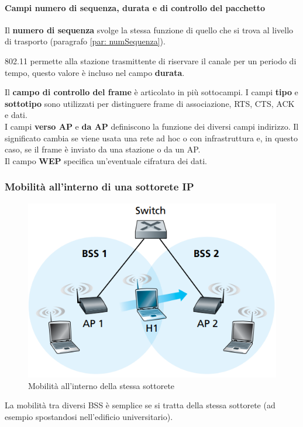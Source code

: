 \documentclass[11pt,a4paper]{article}
\begin{document}
{\paragraph{Campi numero di sequenza, durata e di controllo del pacchetto}
Il \textbf{numero di sequenza} svolge la stessa funzione di quello che si trova al livello di trasporto (paragrafo \ref{par: numSequenza}).

802.11 permette alla stazione trasmittente di riservare il canale per un periodo di tempo, questo valore è incluso nel campo \textbf{durata}.

Il \textbf{campo di controllo del frame} è articolato in più sottocampi. I campi \textbf{tipo} e \textbf{sottotipo} sono utilizzati per distinguere frame di associazione, RTS, CTS, ACK e dati. \\
I campi \textbf{verso AP} e \textbf{da AP} definiscono la funzione dei diversi campi indirizzo. Il significato cambia se viene usata una rete ad hoc o con infrastruttura e, in questo caso, se il frame è inviato da una stazione o da un AP. \\
Il campo \textbf{WEP} specifica un'eventuale cifratura dei dati.

\subsubsection{Mobilità all'interno di una sottorete IP}
\begin{figure}
		\includegraphics[scale=0.6]{img/103.png}
		\caption{Mobilità all'interno della stessa sottorete}
		\label{fig: 103}
\end{figure}
La mobilità tra diversi BSS è semplice se si tratta della stessa sottorete (ad esempio spostandosi nell'edificio universitario).

}
\end{document}
